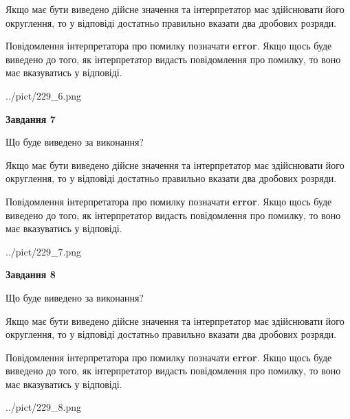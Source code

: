 \documentclass[12pt, ukrainian]{article}
\begin{document}
{\begin {Large}
Якщо має бути виведено дійсне значення та інтерпретатор має здійснювати його округлення, 
то у відповіді достатньо правильно вказати два дробових розряди.

Повідомлення інтерпретатора про помилку позначати \textbf{error}.
Якщо щось буде виведено до того, як інтерпретатор видасть повідомлення про помилку, 
то воно має вказуватись у відповіді. \par

\begin{center}
	{../pict/229_6.png}
\end{center}
\newpage

{\begin {center}\textbf{Завдання 7}\end {center}}\par
Що буде виведено за виконання? \par

Якщо має бути виведено дійсне значення та інтерпретатор має здійснювати його округлення, 
то у відповіді достатньо правильно вказати два дробових розряди.

Повідомлення інтерпретатора про помилку позначати \textbf{error}.
Якщо щось буде виведено до того, як інтерпретатор видасть повідомлення про помилку, 
то воно має вказуватись у відповіді. \par

\begin{center}
	{../pict/229_7.png}
\end{center}
\newpage

{\begin {center}\textbf{Завдання 8}\end {center}}\par
Що буде виведено за виконання? \par

Якщо має бути виведено дійсне значення та інтерпретатор має здійснювати його округлення, 
то у відповіді достатньо правильно вказати два дробових розряди.

Повідомлення інтерпретатора про помилку позначати \textbf{error}.
Якщо щось буде виведено до того, як інтерпретатор видасть повідомлення про помилку, 
то воно має вказуватись у відповіді. \par

\begin{center}
	{../pict/229_8.png}
\end{center}
\newpage


\end{Large}}
\end{document}

